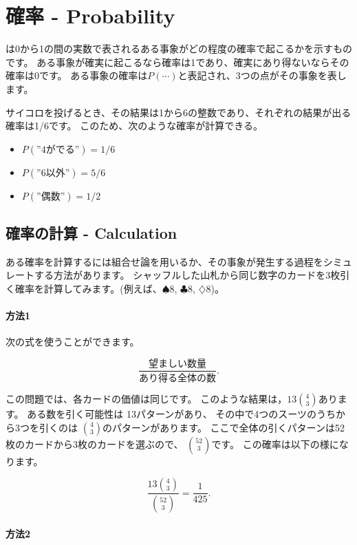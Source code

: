 \chapter{確率 - Probability}


は0から1の間の実数で表されるある事象がどの程度の確率で起こるかを示すものです。
ある事象が確実に起こるなら確率は1であり、確実にあり得ないならその確率は0です。
ある事象の確率は$P(\cdots)$と表記され、3つの点がその事象を表します。

サイコロを投げるとき、その結果は1から6の整数であり、それぞれの結果が出る確率は1/6です。
このため、次のような確率が計算できる。

\begin{itemize}[noitemsep]
\item $P(\textrm{''4がでる''})=1/6$
\item $P(\textrm{''6以外''})=5/6$
\item $P(\textrm{''偶数''})=1/2$
\end{itemize}

\section{確率の計算 - Calculation}


ある確率を計算するには組合せ論を用いるか、その事象が発生する過程をシミュレートする方法があります。
シャッフルした山札から同じ数字のカードを3枚引く確率を計算してみます。(例えば、$\spadesuit 8$, $\clubsuit 8$, $\diamondsuit 8$)。

\subsubsection*{方法1}

次の式を使うことができます。

\[\frac{\textrm{望ましい数量}}{\textrm{あり得る全体の数}}.\]

この問題では、各カードの価値は同じです。
このような結果は，$13 {4 \choose 3}$あります。
ある数を引く可能性は 13パターンがあり、
その中で4つのスーツのうちから3つを引くのは
${4 \choose 3}$のパターンがあります。
ここで全体の引くパターンは52枚のカードから3枚のカードを選ぶので、
${52 \choose 3}$です。
この確率は以下の様になります。

\[\frac{13 {4 \choose 3}}{{52 \choose 3}} = \frac{1}{425}.\]

\subsubsection*{方法2}

